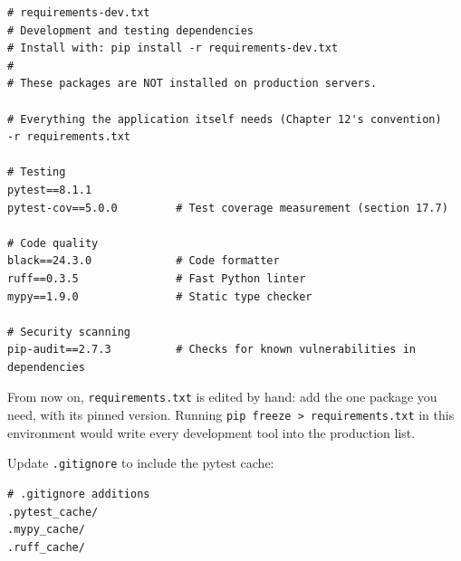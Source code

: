 \begin{outputbox}
\begin{Verbatim}[fontsize=\codesize, breaklines, breakanywhere, breaksymbolleft={\tiny\textcolor{muted}{$\hookrightarrow$}}]
# requirements-dev.txt
# Development and testing dependencies
# Install with: pip install -r requirements-dev.txt
#
# These packages are NOT installed on production servers.

# Everything the application itself needs (Chapter 12's convention)
-r requirements.txt

# Testing
pytest==8.1.1
pytest-cov==5.0.0         # Test coverage measurement (section 17.7)

# Code quality
black==24.3.0             # Code formatter
ruff==0.3.5               # Fast Python linter
mypy==1.9.0               # Static type checker

# Security scanning
pip-audit==2.7.3          # Checks for known vulnerabilities in dependencies
\end{Verbatim}
\end{outputbox}

\begin{codebox}[short]

\begin{Shaded}
\begin{Highlighting}[]
\end{Highlighting}
\end{Shaded}

\end{codebox}

\noindent{}From now on, \texttt{requirements.txt} is edited by hand: add the one package you need, with its pinned version. Running \texttt{pip\ freeze\ \textgreater{}\ requirements.}\allowbreak{}\texttt{txt} in this environment would write every development tool into the production list.

Update \texttt{.gitignore} to include the pytest cache:

\begin{outputbox}[short]
\begin{Verbatim}[fontsize=\codesize, breaklines, breakanywhere, breaksymbolleft={\tiny\textcolor{muted}{$\hookrightarrow$}}]
# .gitignore additions
.pytest_cache/
.mypy_cache/
.ruff_cache/
\end{Verbatim}
\end{outputbox}

